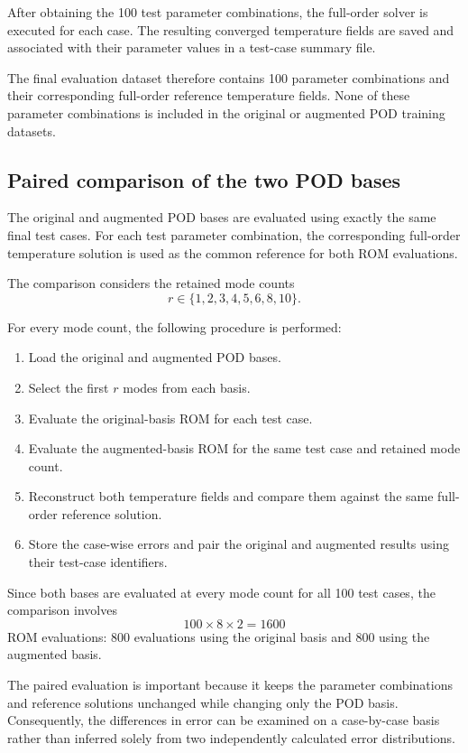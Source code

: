 After obtaining the 100 test parameter combinations, the
full-order solver is executed for each case. The resulting
converged temperature fields are saved and associated with
their parameter values in a test-case summary file.

The final evaluation dataset therefore contains 100
parameter combinations and their corresponding full-order
reference temperature fields. None of these parameter
combinations is included in the original or augmented
POD training datasets.

\subsection{Paired comparison of the two POD bases}

The original and augmented POD bases are evaluated using
exactly the same final test cases. For each test parameter
combination, the corresponding full-order temperature
solution is used as the common reference for both ROM
evaluations.

The comparison considers the retained mode counts
\[
\boxed{
r\in\{1,2,3,4,5,6,8,10\}.
}
\]

For every mode count, the following procedure is performed:
\begin{enumerate}
    \item Load the original and augmented POD bases.
    \item Select the first $r$ modes from each basis.
    \item Evaluate the original-basis ROM for each test case.
    \item Evaluate the augmented-basis ROM for the same
    test case and retained mode count.
    \item Reconstruct both temperature fields and compare
    them against the same full-order reference solution.
    \item Store the case-wise errors and pair the original
    and augmented results using their test-case identifiers.
\end{enumerate}

Since both bases are evaluated at every mode count for all
100 test cases, the comparison involves
\[
100\times8\times2=1600
\]
ROM evaluations: 800 evaluations using the original basis
and 800 using the augmented basis.

The paired evaluation is important because it keeps the
parameter combinations and reference solutions unchanged
while changing only the POD basis. Consequently, the
differences in error can be examined on a case-by-case
basis rather than inferred solely from two independently
calculated error distributions.

